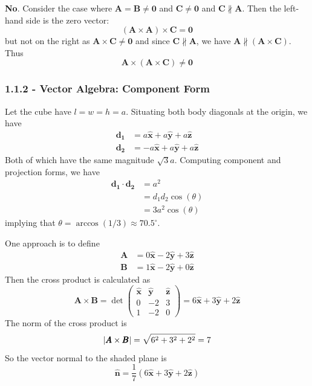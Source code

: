 \documentclass[a4paper]{article}
\begin{document}
\textbf{No}. Consider the case where \( \pmb{A} = \pmb{B} \neq \pmb{0} \) and \( \pmb{C} \neq \pmb{0} \) and \( \pmb{C} \nparallel \pmb{A} \). Then the left-hand side is the zero vector:
\[
	\!\left( \pmb{A} \times \pmb{A} \right) \times \pmb{C} = \pmb{0} 
\]
but not on the right as \( \pmb{A} \times \pmb{C} \neq \pmb{0} \) and since \( \pmb{C} \nparallel \pmb{A} \), we have \( \pmb{A} \nparallel \!\left( \pmb{A} \times \pmb{C} \right) \). Thus
\[
	\pmb{A} \times \!\left( \pmb{A} \times \pmb{C} \right) \neq \pmb{0}
\]

\subsubsection{\textsf{1.1.2 - Vector Algebra: Component Form}}

Let the cube have \( l = w = h = a \). Situating both body diagonals at the origin, we have
\begin{align*}
	\pmb{d_{1}} & = a \pmb{\hat{x}} + a \pmb{\hat{y}} + a \pmb{\hat{z}} \\
	\pmb{d_{2}} & = -a \pmb{\hat{x}} + a \pmb{\hat{y}} + a \pmb{\hat{z}}
\end{align*}
Both of which have the same magnitude \( \sqrt{3}a \). Computing component and projection forms, we have
\begin{align*}
	\pmb{d_{1}} \cdot \pmb{d_{2}} & = a^{2} \\
	 & = d_{1}d_{2}\cos\!\left(\theta\right) \\ 
	 & = 3a^{2}\cos\!\left(\theta\right)
\end{align*}
implying that \( \theta = \arccos\!\left( 1 / 3 \right) \approx 70.5^{\circ} \). 

\vspace{12pt}


One approach is to define
\begin{align*}
	\pmb{A} & = 0 \pmb{\hat{x}} - 2 \pmb{\hat{y}} + 3 \pmb{\hat{z}} \\
	\pmb{B} & = 1 \pmb{\hat{x}} - 2 \pmb{\hat{y}} + 0 \pmb{\hat{z}}
\end{align*}
Then the cross product is calculated as 
\[
	\pmb{A} \times \pmb{B} = \det \begin{pmatrix}
		\pmb{\hat{x}} & \pmb{\hat{y}} & \pmb{\hat{z}} \\
		0 & -2 & 3 \\
		1 & -2 & 0
	\end{pmatrix}
	= 6 \pmb{\hat{x}} + 3 \pmb{\hat{y}} + 2 \pmb{\hat{z}}
\]
The norm of the cross product is 
\[
	\abs{\pmb{A} \times \pmb{B}} = \sqrt{6^{2} + 3^{2} + 2^{2}} = 7 
\]
So the vector normal to the shaded plane is
\[
	\pmb{\hat{n}} = \frac{1}{7}\!\left( 6 \pmb{\hat{x}} + 3 \pmb{\hat{y}} + 2 \pmb{\hat{z}} \right) 
\]
\end{document}

